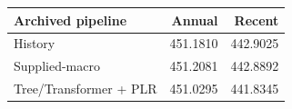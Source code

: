 \begin{tabular}{lrr}
\toprule
Archived pipeline & Annual & Recent \\
\midrule
History & 451.1810 & 442.9025 \\
Supplied-macro & 451.2081 & 442.8892 \\
Tree/Transformer + PLR & 451.0295 & 441.8345 \\
\bottomrule
\end{tabular}
